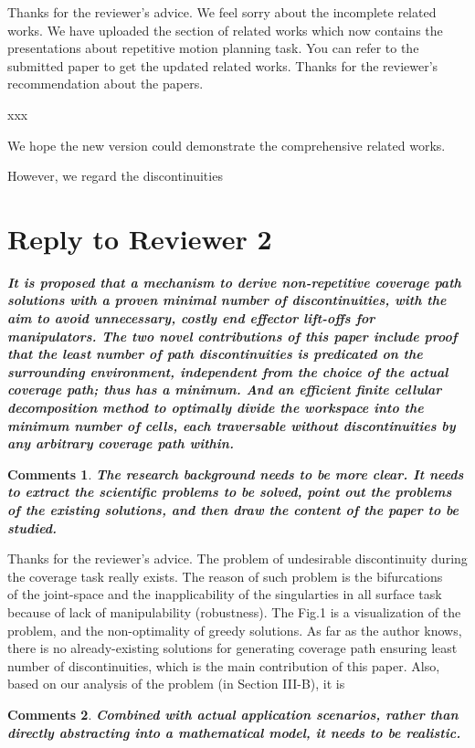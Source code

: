 \documentclass[utf8]{article}
\newtheorem{theorem}{Comments}[section]
\begin{document}
Thanks for the reviewer's advice. We feel sorry about the incomplete related works. We have uploaded the section of related works which now contains the presentations about repetitive motion planning task. You can refer to the submitted paper to get the updated related works. Thanks for the reviewer's recommendation about the papers. 

xxx

We hope the new version could demonstrate the comprehensive related works. 

However, we regard the discontinuities 


\section{Reply to Reviewer 2}
\textbf{\textit{It is proposed that a mechanism to derive non-repetitive coverage path solutions with a proven minimal number of discontinuities, with the aim to avoid unnecessary, costly end effector lift-offs for manipulators. The two novel contributions of this paper include proof that the least number of path discontinuities is predicated on the surrounding environment, independent from the choice of the actual coverage path; thus has a minimum. And an efficient finite cellular decomposition method to optimally divide the workspace into the minimum number of cells, each traversable without discontinuities by any arbitrary coverage path within.}}

\begin{theorem}
\textbf{The research background needs to be more clear. It needs to extract the scientific problems to be solved, point out the problems of the existing solutions, and then draw the content of the paper to be studied.}
\end{theorem}

Thanks for the reviewer's advice. The problem of undesirable discontinuity during the coverage task really exists. The reason of such problem is the bifurcations~\cite{}~\cite{} of the joint-space and the inapplicability of the singularties in all surface task because of lack of manipulability (robustness). The Fig.1 is a visualization of the problem, and the non-optimality of greedy solutions. 
As far as the author knows, there is no already-existing solutions for generating coverage path ensuring least number of discontinuities, which is the main contribution of this paper. Also, based on our analysis of the problem (in Section III-B), it is 
\begin{theorem}
\textbf{Combined with actual application scenarios, rather than directly abstracting into a mathematical model, it needs to be realistic.
}
\end{theorem}
\end{document}
